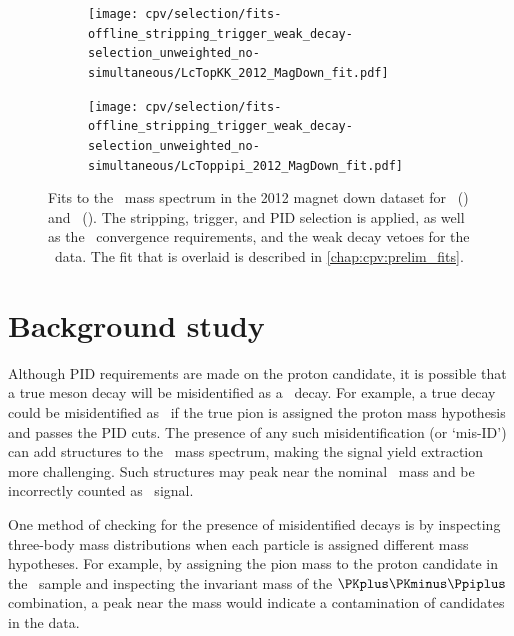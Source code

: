 \begin{figure}
  \begin{subfigure}[b]{0.5\textwidth}
    \texttt{[image: cpv/selection/fits-offline\_stripping\_trigger\_weak\_decay-selection\_unweighted\_no-simultaneous/LcTopKK\_2012\_MagDown\_fit.pdf]}
    \caption{\pKK}
    \label{fig:cpv:selection:postpid:pKK}
  \end{subfigure}
  \begin{subfigure}[b]{0.5\textwidth}
    \texttt{[image: cpv/selection/fits-offline\_stripping\_trigger\_weak\_decay-selection\_unweighted\_no-simultaneous/LcToppipi\_2012\_MagDown\_fit.pdf]}
    \caption{\ppipi}
    \label{fig:cpv:selection:postpid:ppipi}
  \end{subfigure}
  \caption{%
    Fits to the \PLambdac\ mass spectrum in the 2012 magnet down dataset for 
    \pKK\ () and \ppipi\ 
    ().
    The stripping, trigger, and \ac{PID} selection is applied, as well as the 
    \decaytreefitter\ convergence requirements, and the weak decay vetoes for 
    the \ppipi\ data.
    The fit that is overlaid is described in \cref{chap:cpv:prelim_fits}.
  }
  \label{fig:cpv:selection:postpid}
\end{figure}

\section{Background study}
\label{chap:cpv:selection:background_study}

Although \ac{PID} requirements are made on the proton candidate, it is possible 
that a true meson decay will be misidentified as a \PLambdac\ decay.
For example, a true \decay{\PDsplus}{\PKminus\PKplus\Ppiplus} decay could be 
misidentified as \LcTopKK\ if the true pion is assigned the proton mass 
hypothesis and passes the \ac{PID} cuts.
The presence of any such misidentification (or `mis-ID') can add structures to 
the \PLambdac\ mass spectrum, making the signal yield extraction more 
challenging.
Such structures may peak near the nominal \PLambdac\ mass and be incorrectly 
counted as \PLambdac\ signal.

One method of checking for the presence of misidentified decays is by 
inspecting three-body mass distributions when each particle is assigned 
different mass hypotheses.
For example, by assigning the pion mass to the proton candidate in the \pKK\ 
sample and inspecting the invariant mass of the $\PKplus\PKminus\Ppiplus$ 
combination, a peak near the \PDsplus mass would indicate a contamination of 
\PDsplus candidates in the data.

